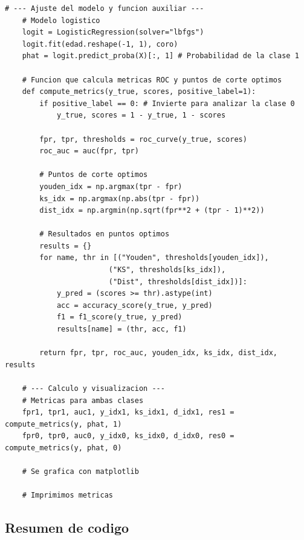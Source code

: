     \begin{lstlisting}[caption={Analisis de Curva ROC para Clasificacion Logistica}, label={lst:roc_analysis_py}]
    # --- Ajuste del modelo y funcion auxiliar ---
    # Modelo logistico
    logit = LogisticRegression(solver="lbfgs")
    logit.fit(edad.reshape(-1, 1), coro)
    phat = logit.predict_proba(X)[:, 1] # Probabilidad de la clase 1

    # Funcion que calcula metricas ROC y puntos de corte optimos
    def compute_metrics(y_true, scores, positive_label=1):
        if positive_label == 0: # Invierte para analizar la clase 0
            y_true, scores = 1 - y_true, 1 - scores

        fpr, tpr, thresholds = roc_curve(y_true, scores)
        roc_auc = auc(fpr, tpr)

        # Puntos de corte optimos
        youden_idx = np.argmax(tpr - fpr)
        ks_idx = np.argmax(np.abs(tpr - fpr))
        dist_idx = np.argmin(np.sqrt(fpr**2 + (tpr - 1)**2))

        # Resultados en puntos optimos
        results = {}
        for name, thr in [("Youden", thresholds[youden_idx]),
                        ("KS", thresholds[ks_idx]),
                        ("Dist", thresholds[dist_idx])]:
            y_pred = (scores >= thr).astype(int)
            acc = accuracy_score(y_true, y_pred)
            f1 = f1_score(y_true, y_pred)
            results[name] = (thr, acc, f1)

        return fpr, tpr, roc_auc, youden_idx, ks_idx, dist_idx, results

    # --- Calculo y visualizacion ---
    # Metricas para ambas clases
    fpr1, tpr1, auc1, y_idx1, ks_idx1, d_idx1, res1 = compute_metrics(y, phat, 1)
    fpr0, tpr0, auc0, y_idx0, ks_idx0, d_idx0, res0 = compute_metrics(y, phat, 0)

    # Se grafica con matplotlib

    # Imprimimos metricas
    \end{lstlisting}


\subsection{Resumen de codigo}

